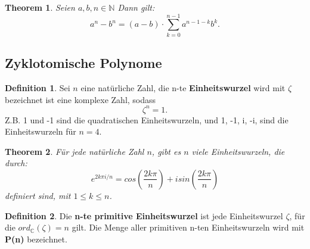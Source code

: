 \documentclass[12pt,oneside]{article}
\newtheorem{theorem}{Theorem}[section]
\theoremstyle{remark}
\theoremstyle{definition}
\newtheorem{definition}{Definition}[section]
\begin{document}
\smallskip

\begin{theorem}\label{funny_id}
Seien $a,b,n \in \mathbb{N}$ Dann gilt:\newline\newline \begin{equation}
    a^{n} - b^n = (a - b) \cdot \sum_{k = 0}^{n - 1} a^{n -1 - k} b^k.
\end{equation}
\end{theorem}


\smallskip

\subsection{Zyklotomische Polynome}

\begin{definition}
Sei $n$ eine natürliche Zahl, die n-te \textbf{Einheitswurzel} wird mit $\zeta$ bezeichnet ist eine komplexe Zahl, sodass
\begin{equation}
    \zeta^n = 1.
\end{equation}
Z.B. 1 und -1 sind die quadratischen Einheitswurzeln, und 1, -1, i, -i, sind die Einheitswurzeln für $n = 4$.    
\end{definition}

\smallskip

\begin{theorem}
Für jede natürliche Zahl $n$, gibt es $n$ viele Einheitswurzeln, die durch:\newline
\begin{equation}
    e^{2k\pi i/n} = cos(\frac{2k \pi }{n}) + i sin(\frac{2k \pi}{n})
\end{equation}
definiert sind, mit $1 \leq k \leq n$.
\end{theorem}

\smallskip


\smallskip

\begin{definition}\label{prim_ein}
Die \textbf{n-te primitive Einheitswurzel} ist jede Einheitswurzel $\zeta$, für die $ord_{\mathbb{C}}(\zeta) = n $ gilt. Die Menge aller primitiven n-ten Einheitswurzeln wird mit \textbf{P(n)} bezeichnet. 
\end{definition}

\smallskip
\end{document}
